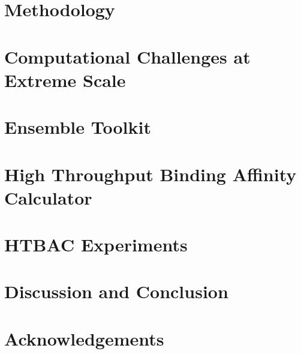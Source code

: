 \documentclass[conference]{IEEEtran}
\begin{document}
\section{Methodology}\label{sec:meth}





\section{Computational Challenges at Extreme Scale}\label{sec:3}



\section{Ensemble Toolkit}\label{sec:4}




\section{High Throughput Binding Affinity Calculator}\label{sec:htbac}



\section{HTBAC Experiments}\label{sec:6}



\section{Discussion and Conclusion}\label{sec:conclusion}



\section*{Acknowledgements}





\end{document}
